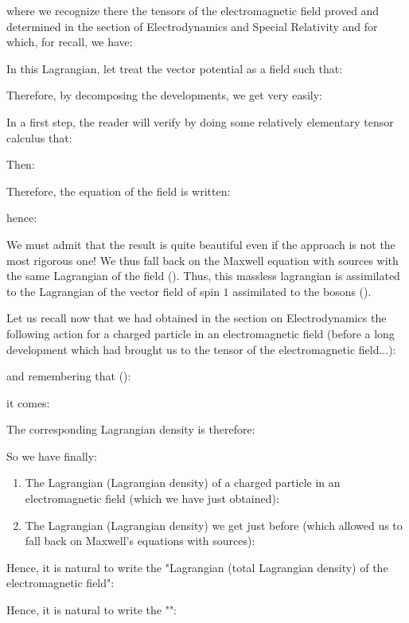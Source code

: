 	where we recognize there the tensors of the electromagnetic field proved and determined in the section of Electrodynamics and Special Relativity and for which, for recall, we have:
	
	In this Lagrangian, let treat the vector potential as a field such that:
	
	Therefore, by decomposing the developments, we get very easily:
	
	In a first step, the reader will verify by doing some relatively elementary tensor calculus that:
	
	Then:
	
	Therefore, the equation of the field is written:
	
	hence:
	
	We must admit that the result is quite beautiful even if the approach is not the most rigorous one! We thus fall back on the Maxwell equation with sources with the same Lagrangian of the field (). Thus, this massless lagrangian is assimilated to the Lagrangian of the vector field of spin $1$ assimilated to the bosons ().

	Let us recall now that we had obtained in the section on Electrodynamics the following action for a charged particle in an electromagnetic field (before a long development which had brought us to the tensor of the electromagnetic field...):
	
	and remembering that ():
	
	it comes:
	
	The corresponding Lagrangian density is therefore:
	
	So we have finally:
	\begin{enumerate}
		\item The Lagrangian (Lagrangian density) of a charged particle in an electromagnetic field (which we have just obtained):
		
		\item The Lagrangian (Lagrangian density) we get just before (which allowed us to fall back on Maxwell's equations with sources):
		
	\end{enumerate}
	Hence, it is natural to write the "Lagrangian (total Lagrangian density) of the electromagnetic field":
	
	Hence, it is natural to write the "":
	

